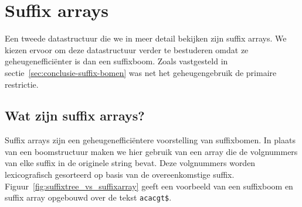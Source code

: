 \chapter{Suffix arrays}\label{ch:suffix-arrays}
Een tweede datastructuur die we in meer detail bekijken zijn suffix arrays.
We kiezen ervoor om deze datastructuur verder te bestuderen omdat ze geheugenefficiënter is dan een suffixboom.
Zoals vastgesteld in sectie~\ref{sec:conclusie-suffix-bomen} was net het geheugengebruik de primaire restrictie.


\section{Wat zijn suffix arrays?}\label{sec:wat-zijn-suffix-arrays?}
Suffix arrays zijn een geheugenefficiëntere voorstelling van suffixbomen.
In plaats van een boomstructuur maken we hier gebruik van een array die de volgnummers van elke suffix in de originele string bevat.
Deze volgnummers worden lexicografisch gesorteerd op basis van de overeenkomstige suffix.
Figuur~\ref{fig:suffixtree_vs_suffixarray} geeft een voorbeeld van een suffixboom en suffix array opgebouwd over de tekst \texttt{acacgt\$}.

